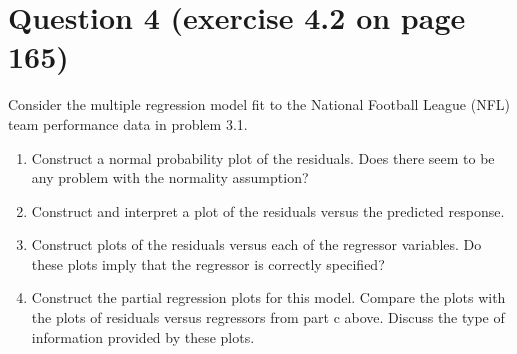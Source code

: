 \documentclass{article}
\newcommand\bsc[2][\DefaultOpt]{%
  \def\DefaultOpt{#2}%
  \section[#1]{#2}%
}
\newcommand{\balist}{\begin{enumerate}[label=\alph*.]}
\newcommand{\elist}{\end{enumerate}}
\begin{document}
\bsc{Question 4 (exercise 4.2 on page 165)}{
Consider the multiple regression model fit to the National Football League (NFL) team performance data in problem 3.1.

\balist
\item Construct a normal probability plot of the residuals. Does there seem to be any problem with the normality assumption?
\item Construct and interpret a plot of the residuals versus the predicted response.
\item Construct plots of the residuals versus each of the regressor variables. Do these plots imply that the regressor is correctly specified?
\item Construct the partial regression plots for this model. Compare the plots with the plots of residuals versus regressors from part c above. Discuss the type of information provided by these plots.
\elist
}
\end{document}

